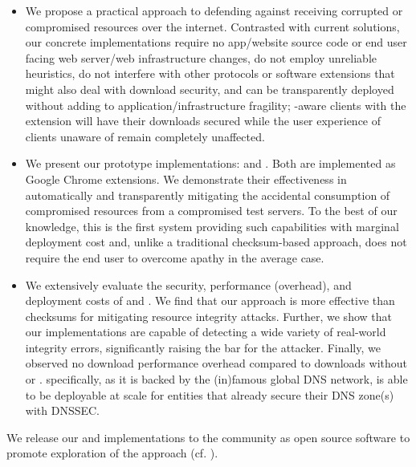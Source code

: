 \begin{itemize}

  \item We propose a practical approach to defending against receiving corrupted
  or compromised resources over the internet. Contrasted with current solutions,
  our concrete implementations require no app/website source code or end user
  facing web server/web infrastructure changes, do not employ unreliable
  heuristics, do not interfere with other protocols or software extensions that
  might also deal with download security, and can be transparently deployed
  without adding to application/infrastructure fragility; \eg \SYSTEM{}-aware
  clients with the extension will have their downloads secured while the user
  experience of clients unaware of \SYSTEM{} remain completely unaffected.

  \item We present our prototype \SYSTEM{} implementations: \DNSSYS{} and
  \DHTSYS{}. Both are implemented as Google Chrome extensions. We demonstrate
  their effectiveness in automatically and transparently mitigating the
  accidental consumption of compromised resources from a compromised test
  servers. To the best of our knowledge, this is the first system providing such
  capabilities with marginal deployment cost and, unlike a traditional
  checksum-based approach, does not require the end user to overcome apathy in
  the average case.

  \item We extensively evaluate the security, performance (overhead), and
  deployment costs of \DNSSYS{} and \DHTSYS{}. We find that our approach is more
  effective than checksums for mitigating resource integrity attacks. Further,
  we show that our implementations are capable of detecting a wide variety of
  real-world integrity errors, significantly raising the bar for the attacker.
  Finally, we observed no download performance overhead compared to downloads
  without \DNSSYS{} or \DHTSYS{}. \DNSSYS{} specifically, as it is backed by the
  (in)famous global DNS network, is able to be deployable at scale for entities
  that already secure their DNS zone(s) with DNSSEC.

\end{itemize}

We release our \DNSSYS{} and \DHTSYS{} implementations to the
community as open source software to promote exploration of the \SYSTEM{}
approach (cf. ).
